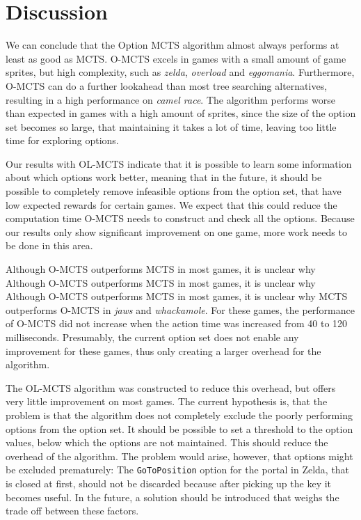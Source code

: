 \chapter{Discussion}
\label{sec:conclusion}



We can conclude that the Option MCTS algorithm almost always performs at least
as good as MCTS. O-MCTS excels in games with a small amount of game sprites, but
high complexity, such as \textit{zelda}, \textit{overload} and \textit{eggomania}.
Furthermore, O-MCTS can do a further lookahead than most tree searching
alternatives, resulting in a high performance on \textit{camel race}. The
algorithm performs worse than expected in games with a high amount of sprites,
since the size of the option set becomes so large, that maintaining it takes a
lot of time, leaving too little time for exploring options. 

Our results with OL-MCTS indicate that it is possible to learn some information
about which options work better, meaning that in the future, it should be
possible to completely remove infeasible options from the option set, that have
low expected rewards for certain games. We expect that this could reduce the
computation time O-MCTS needs to construct and check all the options.
Because our results only show significant improvement on one game, more work
needs to be done in this area.

Although O-MCTS outperforms MCTS in most games, it is unclear why Although
O-MCTS outperforms MCTS in most games, it is unclear why Although O-MCTS
outperforms MCTS in most games, it is unclear why MCTS outperforms O-MCTS in
\textit{jaws} and \textit{whackamole}. For these games, the performance of
O-MCTS did not increase when the action time was increased from 40 to 120
milliseconds. Presumably, the current option set does not enable any improvement
for these games, thus only creating a larger overhead for the algorithm.

The OL-MCTS algorithm was constructed to reduce this overhead, but offers very
little improvement on most games. The current hypothesis is, that the problem is
that the algorithm does not completely exclude the poorly performing options
from the option set. It should be possible to set a threshold to the option
values, below which the options are not maintained. This should reduce the
overhead of the algorithm. The problem would arise, however, that options might
be excluded prematurely: The \texttt{GoToPosition} option for the portal in
Zelda, that is closed at first, should not be discarded because after picking up
the key it becomes useful. In the future, a solution should be introduced that
weighs the trade off between these factors.

